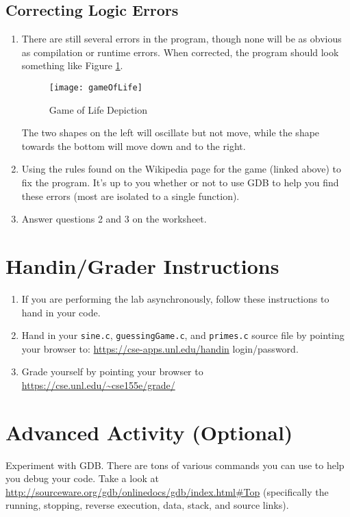 \documentclass[12pt]{scrartcl}
\begin{document}
\subsection{Correcting Logic Errors}

\begin{enumerate}
  \item There are still several errors in the program, though none will be as 
  	obvious as compilation or runtime errors.  When corrected, the program 
	should look something like Figure \ref{fig:gameOfLife}.
\begin{figure}
\centering
\texttt{[image: gameOfLife]}
\caption{Game of Life Depiction}
\label{fig:gameOfLife}
\end{figure}
	The two shapes on the left will oscillate but not move, while the shape 
	towards the bottom will move down and to the right.
  \item Using the rules found on the Wikipedia page for the game (linked above) to 
  	fix the program.  It's up to you whether or not to use GDB to help you find these 
	errors (most are isolated to a single function).
  \item Answer questions 2 and 3 on the worksheet.  
\end{enumerate}



\section{Handin/Grader Instructions}

\begin{enumerate}
  \item If you are performing the lab asynchronously, follow these instructions to hand in your code.
  \item Hand in your \texttt{sine.c}, \texttt{guessingGame.c}, and \texttt{primes.c} source file by pointing your browser to:
  	\url{https://cse-apps.unl.edu/handin}
	login/password.
  \item Grade yourself by pointing your browser to
  	\url{https://cse.unl.edu/~cse155e/grade/}
\end{enumerate}

\section{Advanced Activity (Optional)}

Experiment with GDB.  There are tons of various commands you can use 
to help you debug your code.  Take a look at \url{http://sourceware.org/gdb/onlinedocs/gdb/index.html#Top} 
(specifically the running, stopping, reverse execution, data, stack, and 
source links).  
\end{document}
